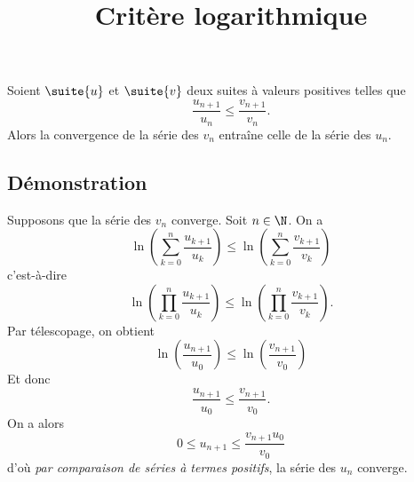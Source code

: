 \documentclass[fontsize=12pt,twoside=false,parskip=half]{scrartcl}
\title{Critère logarithmique}
\date{}
\author{}
\begin{document}
\maketitle
   \begin{Theoreme}
      Soient $\suite{u}$ et $\suite{v}$ deux suites à valeurs positives telles que 
      \[
         \frac{u_{n + 1}}{u_n} \leq \frac{v_{n + 1}}{v_n}.
      \]
      Alors la convergence de la série des $v_n$ entraîne celle de la série des $u_n$.
   \end{Theoreme}
   \subsection{Démonstration}
      Supposons que la série des $v_n$ converge. Soit $n \in \N$. On a
      \[
         \ln \left( \sum_{k = 0}^n \frac{u_{k + 1}}{u_k} \right) \leq \ln \left( \sum_{k = 0}^n \frac{v_{k + 1}}{v_k} \right)
      \]
      c’est-à-dire
      \[
        \ln \left(\prod_{k = 0}^n \frac{u_{k + 1}}{u_k} \right) \leq \ln \left(\prod_{k = 0}^n\frac{v_{k + 1}}{v_k} \right).
      \]
      Par télescopage, on obtient
      \[
         \ln \left(\frac{u_{n + 1}}{u_0}\right) \leq \ln\left(\frac{v_{n + 1}}{v_0}\right)
      \]
      Et donc 
      \[
         \frac{u_{n + 1}}{u_0} \leq \frac{v_{n + 1}}{v_0}.
      \]
      On a alors
      \[
         0 \leq u_{n + 1} \leq \frac{v_{n + 1} u_0}{v_0}
      \]
      d’où \emph{par comparaison de séries à termes positifs}, la série des $u_n$ converge.
\end{document}
